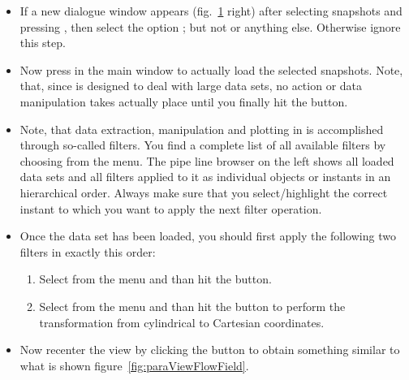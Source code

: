 \documentclass[a4paper, 11pt, DIV=11]{scrartcl}
\begin{document}
\begin{itemize}
\begin{figure}[htb]
{the \hdf files. If there is more than one  reader, chose the
first on in the appearing dialogue window (right).}
\label{fig:paraViewFlowFieldLoadXmf}
\end{figure}
There you will see a list of the available \hdf files and the corresponding
 files as shown in figure~\ref{fig:paraViewFlowFieldLoadXmf}. The
 files are simple text files, which contain meta data about the
content of the \hdf container. The  files act as a reader or interface
through which \paraview access the data in the \hdf container. Select one single
or a group of several  files and press . Note, that all files
with the same base name are automatically grouped. So if there are many flow
field files in this directory, you can easily load the entire time series of
snapshots by selecting the group instead of a single  file. Note,
however, that loading a large number of snapshots might take very long for large
simulations!
\item
If a new dialogue window appears (fig.~\ref{fig:paraViewFlowFieldLoadXmf}
right) after selecting snapshots and pressing , then select the
option ; but not 
or anything else. Otherwise ignore this step.
\item
Now press  in the main \paraview window to actually load the selected snapshots.
Note, that, since \paraview is designed to deal with large data sets, no action or data
manipulation takes actually place until you finally hit the  button.
\item
Note, that data extraction, manipulation and plotting in \paraview is accomplished
through so-called filters. You find a complete list of all available filters by
choosing  from the menu. The pipe line browser
on the left shows all loaded data sets and all filters applied to it as individual
objects or instants in an hierarchical order. Always make sure that you select/highlight
the correct instant to which you want to apply the next filter operation.
\item
Once the data set has been loaded, you should first apply the following
two filters in exactly this order:
\begin{enumerate}
\item
Select  from the menu
and than hit the  button.
\item
Select  from
the menu and than hit the  button to perform the transformation
from cylindrical to Cartesian coordinates.
\end{enumerate}
\item Now recenter the view by clicking the  button to
obtain something similar to what is shown figure~\ref{fig:paraViewFlowField}.
\end{itemize}
\end{document}

